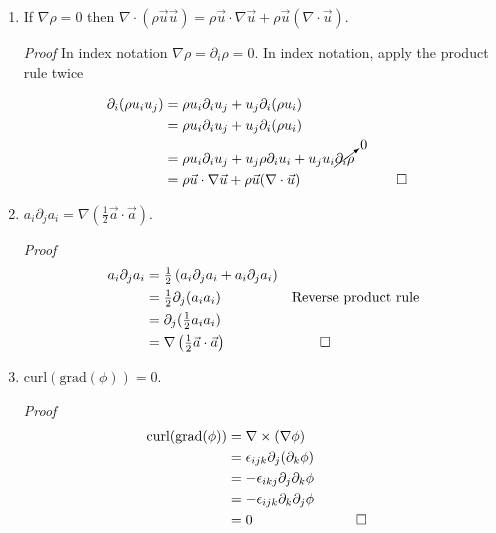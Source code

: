 \documentclass[11pt,twoside]{article}
\renewcommand{\d}{\partial}
\newcommand{\vect}[1]{\vec{#1}}
\newcommand{\grad}{\nabla}
\newcommand{\cross}{\times}
\newcommand{\curl}{\mbox{curl}}
\newcommand{\gradf}{\mbox{grad}}
\newcommand{\inline}[1]{\mbox{$#1$}}
\begin{document}
\begin{enumerate}
%
%
\item If $\nabla\rho=0 $ then $ \nabla\cdot(\rho\vect{u}\vect{u}) = \rho\vect{u}\cdot\nabla\vect{u} + \rho\vect{u}(\nabla\cdot\vect{u})$.

\textit{Proof} In index notation $\nabla\rho=\d_i\rho = 0$. In index notation, apply the product rule twice

\begin{align*}
\d_i(\rho u_iu_j) &= \rho u_i\d_i u_j +u_j\d_i(\rho u_i)\\
&= \rho u_i\d_i u_j +u_j\d_i(\rho u_i)\\
&= \rho u_i\d_i u_j +u_j\rho\d_i u_i + u_ju_i\cancelto{0}{\d_i\rho}&&\\
& = \rho\vect{u}\cdot\nabla\vect{u} + \rho\vect{u}(\nabla\cdot\vect{u})&&\qed
\end{align*}




%
%
\item $a_i\d_ja_i=\grad(\frac{1}{2}\vect{a}\cdot\vect{a})$. 

\textit{Proof} 
\begin{align*}
a_i\d_ja_i &= \inline{\frac{1}{2}}\left(a_i\d_ja_i + a_i\d_ja_i\right) && \\
           &= \inline{\frac{1}{2}}\d_j(a_ia_i) &&\text{Reverse product rule} \\
           &= \d_j(\inline{\frac{1}{2}}a_ia_i) &&\\
           &= \grad\left(\inline{\frac{1}{2}}\vect{a}\cdot\vect{a}\right) &&\qed
\end{align*}

%
%
\item $\curl(\gradf(\phi)) = 0$. 

\textit{Proof} 
\begin{align*}
\curl(\gradf(\phi)) & = \grad\cross(\grad\phi)\\
                    & = \epsilon_{ijk}\d_j(\d_k\phi)\\
                    & = - \epsilon_{ikj}\d_j\d_k\phi\\
                    & = - \epsilon_{ijk}\d_k\d_j\phi\\
                    & = 0 && \qed
\end{align*}


\end{enumerate}
\end{document}
